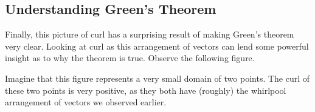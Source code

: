 \documentclass{article}
\begin{document}
    \subsection*{Understanding Green's Theorem}
    Finally, this picture of curl has a surprising result of making Green's theorem very clear.
    Looking at curl as this arrangement of vectors can lend some powerful insight as to why the theorem is true.
    Observe the following figure.

    \begin{figure}[!h]
        \centering
    \end{figure}
    Imagine that this figure represents a very small domain of two points.
    The curl of these two points is very positive, as they both have (roughly) the whirlpool arrangement of vectors we observed earlier.
\end{document}
